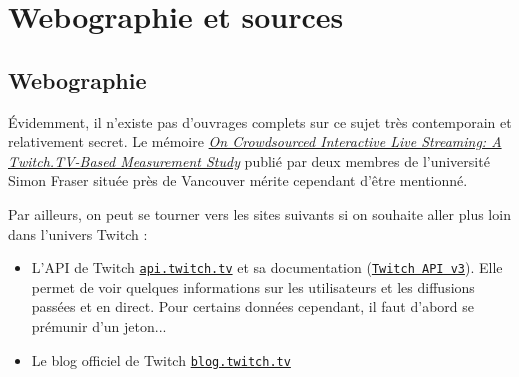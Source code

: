\documentclass[a4paper]{article}
\begin{document}
\newpage 
\section{Webographie et sources}
\subsection{Webographie}
\renewcommand{\refname}{}
Évidemment, il n'existe pas d'ouvrages complets sur ce sujet très contemporain et relativement secret. Le mémoire \href{https://arxiv.org/pdf/1502.04666.pdf}{\textit{On Crowdsourced Interactive Live Streaming: A
Twitch.TV-Based Measurement Study}} publié par deux membres de l'université Simon Fraser située près de Vancouver mérite cependant d'être mentionné.

Par ailleurs, on peut se tourner vers les sites suivants si on souhaite aller plus loin dans l'univers Twitch :
\begin{itemize}
\item L'API de Twitch \href{https://api.twitch.tv/}{\texttt{api.twitch.tv}} et sa documentation (\href{https://github.com/justintv/twitch-api}{\texttt{Twitch API v3}}). Elle permet de voir quelques informations sur les utilisateurs et les diffusions passées et en direct. Pour certains données cependant, il faut d'abord se prémunir d'un jeton...
\item Le blog officiel de Twitch \href{https://blog.twitch.tv/}{\texttt{blog.twitch.tv}} 
\end{itemize}
\end{document}
